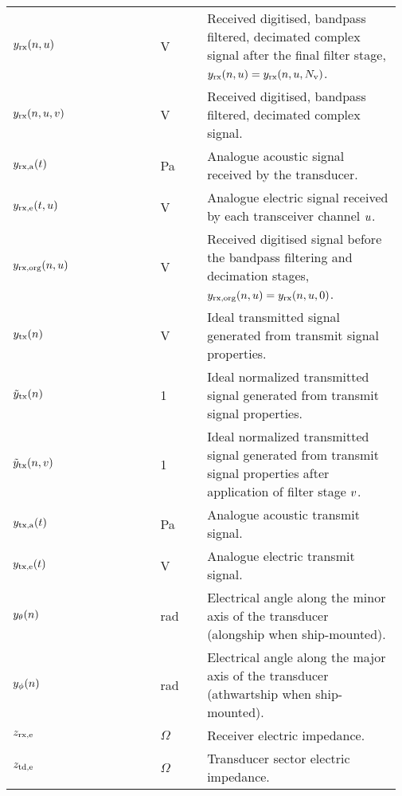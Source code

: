 \documentclass[12pt,a4paper]{article}
\begin{document}
\begin{longtable}{p{0.15\linewidth} p{0.20\linewidth} p{0.12\linewidth} p{0.5\linewidth} }
$y_{\textrm{rx}}(n,u)$ & & V & Received digitised, bandpass filtered, decimated complex signal after the final filter stage, $y_{\textrm{rx}}(n,u) = y_{\textrm{rx}}(n,u,N_{\textrm{v}})$.\\
$y_{\textrm{rx}}(n,u,v)$ & & V & Received digitised, bandpass filtered, decimated complex signal.\\
$y_{\textrm{rx,a}}(t)$ & & Pa & Analogue acoustic signal received by the transducer.\\
$y_{\textrm{rx,e}}(t,u)$ & & V & Analogue electric signal received by each transceiver channel $u$.\\

$y_{\textrm{rx,org}}(n,u)$ & & V & Received digitised signal before the bandpass filtering and decimation stages, $y_{\textrm{rx,org}}(n,u) = y_{\textrm{rx}}(n,u,0)$.\\

$y_{\textrm{tx}}(n)$ & & V & Ideal transmitted signal generated from transmit signal properties.\\
$\tilde{y}_{\textrm{tx}}(n)$ & & 1 & Ideal normalized transmitted signal generated from transmit signal properties.\\
$\tilde{y}_{\textrm{tx}}(n,v)$ & & 1 & Ideal normalized transmitted signal generated from transmit signal properties after application of filter stage $v$.\\

$y_{\textrm{tx,a}}(t)$ & & Pa & Analogue acoustic transmit signal.\\

$y_{\textrm{tx,e}}(t)$ & & V & Analogue electric transmit signal.\\

$y_\theta(n)$ & & rad & Electrical angle along the minor axis of the transducer (alongship when ship-mounted).\\
$y_\phi(n)$ & & rad & Electrical angle along the major axis of the transducer (athwartship when ship-mounted).\\

$z_{\textrm{rx,e}}$ & & $\Omega$ & Receiver electric impedance.\\
$z_{\textrm{td,e}}$ & & $\Omega$ & Transducer sector electric impedance.\\


\end{longtable}
\end{document}
